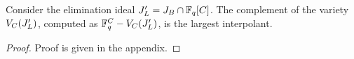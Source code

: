 \begin{Theorem}
\label{thm:large}
Consider the elimination ideal $J'_L = J_B \cap {\mathbb{F}}_{q}[C]$. The
complement of the variety ${V_C}(J'_L)$,  computed as ${\mathbb{F}}_{q}^C - {V_C}(J'_L)$,
is the largest interpolant.
\end{Theorem}

\begin{proof} Proof is given in the appendix. 




\end{proof}

